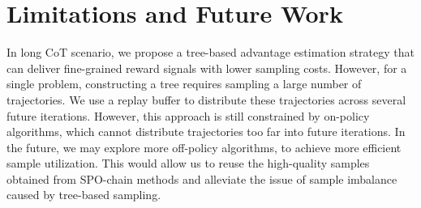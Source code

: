 \section{Limitations and Future Work}
\label{appendix:limitations_and_future_work}
In long CoT scenario, we propose a tree-based advantage estimation strategy that can deliver fine-grained reward signals with lower sampling costs. However, for a single problem, constructing a tree requires sampling a large number of trajectories. We use a replay buffer to distribute these trajectories across several future iterations. However, this approach is still constrained by on-policy algorithms, which cannot distribute trajectories too far into future iterations. In the future, we may explore more off-policy algorithms, to achieve more efficient sample utilization. This would allow us to reuse the high-quality samples obtained from SPO-chain methods and alleviate the issue of sample imbalance caused by tree-based sampling. 